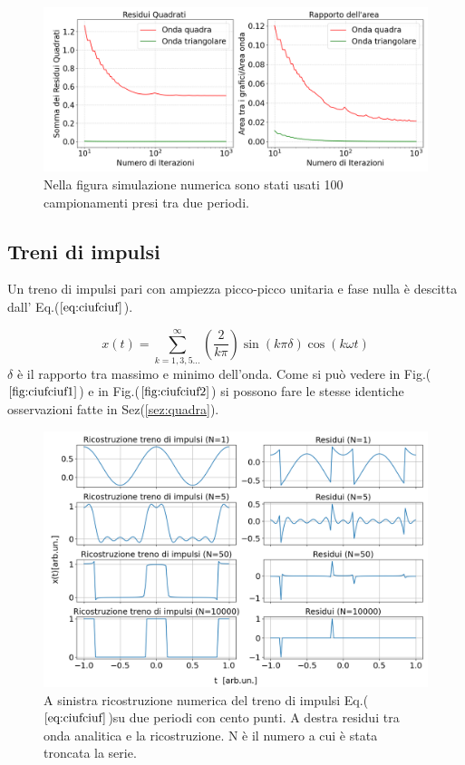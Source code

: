 \documentclass{article}
\begin{document}
      

        \begin{figure}[H]
            \centering
            \includegraphics[width=1\textwidth]{residuals2.png} %
            \caption{Nella figura simulazione numerica sono stati usati 100 campionamenti presi tra due periodi.}
            \label{fig:res2}
        \end{figure}

    \subsection{Treni di impulsi}
    Un treno di impulsi pari con ampiezza picco-picco unitaria e fase nulla è descitta
    dall' Eq.($\ref{eq:ciufciuf}$).

    \begin{equation}
        x(t) = \sum_{k=1,3,5...}^{\infty} \left(\frac{2}{k\pi}\right)\sin\left(k\pi\delta\right)\cos\left(k\omega t\right)
        \label{eq:ciufciuf}
    \end{equation}
    $\delta$ è il rapporto tra massimo e minimo dell'onda.
    Come si può vedere in Fig.($\ref{fig:ciufciuf1} $) e in Fig.($\ref{fig:ciufciuf2} $)
    si possono fare le stesse identiche osservazioni fatte in Sez(\ref{sez:quadra}).
    \begin{figure}[H]
        \centering
        \includegraphics[width=1\textwidth]{foupulsetrainwave1e2.png} %
        \caption{A sinistra ricostruzione numerica del treno di impulsi
        Eq.($\ref{eq:ciufciuf}$)su due periodi con cento punti.
        A destra residui tra onda analitica e la ricostruzione.
        N è il numero a cui è stata troncata la serie. }
        \label{fig:ciufciuf1}
    \end{figure}
\end{document}

